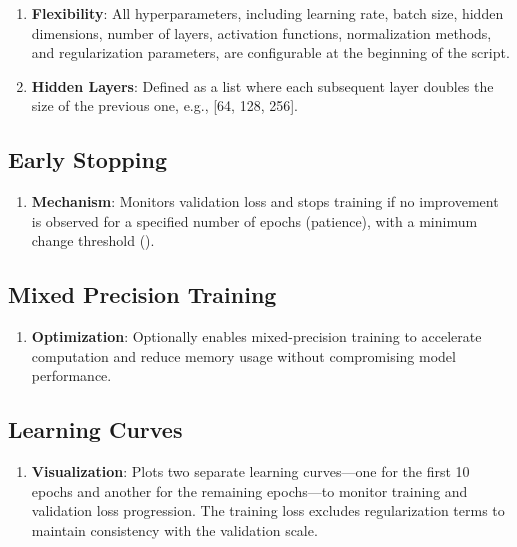\documentclass[12pt]{article}
\begin{document}
\begin{enumerate}[label=\alph*.]
    \item \textbf{Flexibility}: All hyperparameters, including learning rate, batch size, hidden dimensions, number of layers, activation functions, normalization methods, and regularization parameters, are configurable at the beginning of the script.
    \item \textbf{Hidden Layers}: Defined as a list where each subsequent layer doubles the size of the previous one, e.g., [64, 128, 256].
\end{enumerate}

\subsection{Early Stopping}

\begin{enumerate}[label=\alph*.]
    \item \textbf{Mechanism}: Monitors validation loss and stops training if no improvement is observed for a specified number of epochs (patience), with a minimum change threshold ().
\end{enumerate}

\subsection{Mixed Precision Training}

\begin{enumerate}[label=\alph*.]
    \item \textbf{Optimization}: Optionally enables mixed-precision training to accelerate computation and reduce memory usage without compromising model performance.
\end{enumerate}

\subsection{Learning Curves}

\begin{enumerate}[label=\alph*.]
    \item \textbf{Visualization}: Plots two separate learning curves---one for the first 10 epochs and another for the remaining epochs---to monitor training and validation loss progression. The training loss excludes regularization terms to maintain consistency with the validation scale.
\end{enumerate}
\end{document}
